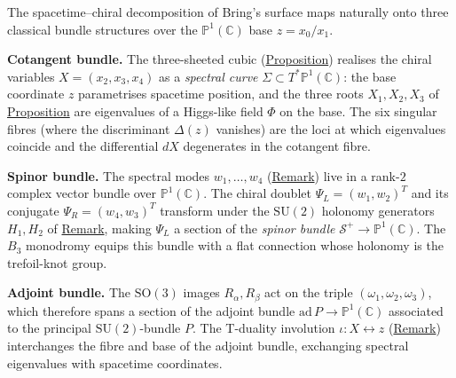 \begin{remark}
  \label{rem:chiral-bundles}
The spacetime--chiral decomposition of Bring's surface maps naturally onto
three classical bundle structures over the $\mathbb{P}^1(\mathbb{C})$ base $z=x_0/x_1$.

\textbf{Cotangent bundle.}
The three-sheeted cubic (\hyperref[prop:chiral-elliptic]{Proposition}) realises the chiral
variables $X=(x_2,x_3,x_4)$ as a \emph{spectral curve}
$\Sigma\subset T^{*}\mathbb{P}^1(\mathbb{C})$: the base coordinate $z$ parametrises
spacetime position, and the three roots $X_1,X_2,X_3$ of
\hyperref[prop:chiral-elliptic]{Proposition} are eigenvalues of a Higgs-like
field $\Phi$ on the base.  The six singular fibres (where the discriminant
$\Delta(z)$ vanishes) are the loci at which eigenvalues coincide and the
differential $dX$ degenerates in the cotangent fibre.

\textbf{Spinor bundle.}
The spectral modes $w_1,\dots,w_4$
(\hyperref[rem:lagrange-resolvents]{Remark}) live in a rank-$2$ complex vector
bundle over $\mathbb{P}^1(\mathbb{C})$.  The chiral doublet
$\Psi_L=(w_1,w_2)^T$ and its conjugate $\Psi_R=(w_4,w_3)^T$ transform
under the $\mathrm{SU}(2)$ holonomy generators
$H_1,H_2$ of
\hyperref[rem:holonomy-trefoil]{Remark}, making $\Psi_L$ a section of the
\emph{spinor bundle} $\mathcal{S}^{+}\to\mathbb{P}^1(\mathbb{C})$.  The $B_3$
monodromy equips this bundle with a flat connection whose holonomy is the
trefoil-knot group.

\textbf{Adjoint bundle.}
The $\mathrm{SO}(3)$ images $R_\alpha,R_\beta$
act on the triple $(\omega_1,\omega_2,\omega_3)$, which therefore spans a
section of the adjoint bundle $\mathrm{ad}\,P\to\mathbb{P}^1(\mathbb{C})$ associated
to the principal $\mathrm{SU}(2)$-bundle $P$.  The T-duality involution
$\iota\colon X\leftrightarrow z$ (\hyperref[rem:t-duality-elliptic]{Remark})
interchanges the fibre and base of the adjoint bundle, exchanging
spectral eigenvalues with spacetime coordinates.
\end{remark}


